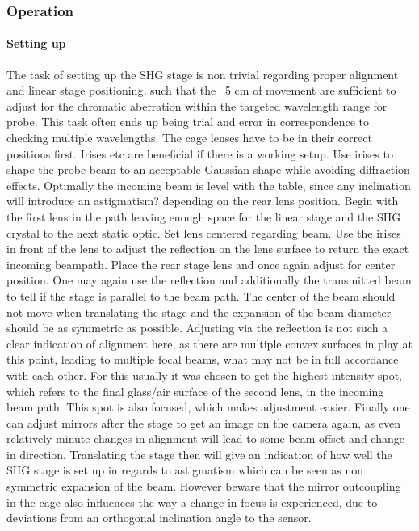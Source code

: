 \documentclass[twoside,openright]{scrreprt}
\begin{document}
\subsubsection{Operation}
\paragraph{Setting up}
The task of setting up the SHG stage is non trivial regarding proper alignment and linear stage positioning, such that the ~5 cm of movement are sufficient to adjust for the chromatic aberration within the targeted wavelength range for probe. This task often ends up being trial and error in correspondence to checking multiple wavelengths. The cage lenses have to be in their correct positions first.\newline
Irises etc are beneficial if there is a working setup.\newline
Use irises to shape the probe beam to an acceptable Gaussian shape while avoiding diffraction effects. Optimally the incoming beam is level with the table, since any inclination will introduce an astigmatism? depending on the rear lens position.\newline
Begin with the first lens in the path leaving enough space for the linear stage and the SHG crystal to the next static optic. Set lens centered regarding beam. Use the irises in front of the lens to adjust the reflection on the lens surface to return the exact incoming beampath.\newline
Place the rear stage lens and once again adjust for center position. One may again use the reflection and additionally the transmitted beam to tell if the stage is parallel to the beam path. The center of the beam should not move when translating the stage and the expansion of the beam diameter should be as symmetric as possible. Adjusting via the reflection is not such a clear indication of alignment here, as there are multiple convex surfaces in play at this point, leading to multiple focal beams, what may not be in full accordance with each other. For this usually it was chosen to get the highest intensity spot, which refers to the final glass/air surface of the second lens, in the incoming beam path. This spot is also focused, which makes adjustment easier.\newline
Finally one can adjust mirrors after the stage to get an image on the camera again, as even relatively minute changes in alignment will lead to some beam offset and change in direction. Translating the stage then will give an indication of how well the SHG stage is set up in regards to astigmatism which can be seen as non symmetric expansion of the beam. However beware that the mirror outcoupling in the cage also influences the way a change in focus is experienced, due to deviations from an orthogonal inclination angle to the sensor.
\end{document}
